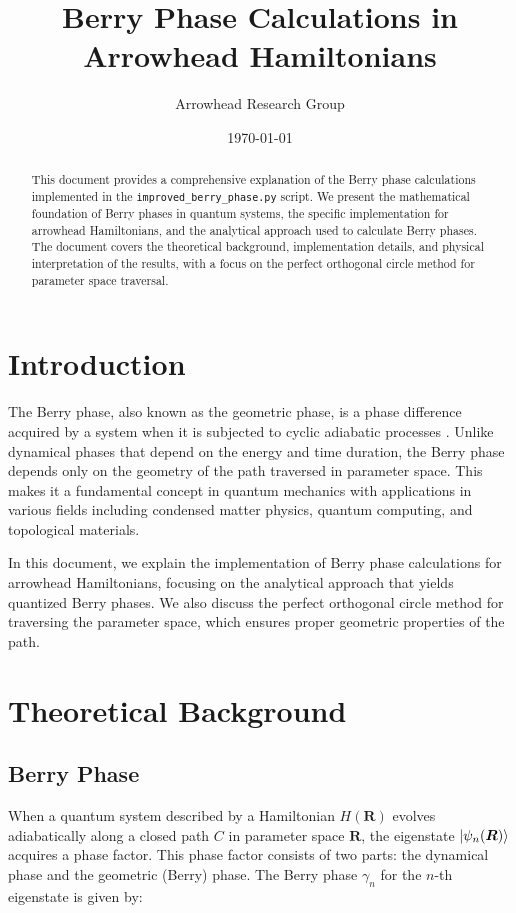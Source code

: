 \documentclass[12pt,a4paper]{article}
\title{Berry Phase Calculations in Arrowhead Hamiltonians}
\author{Arrowhead Research Group}
\date{\today}
\begin{document}
\maketitle

\begin{abstract}
This document provides a comprehensive explanation of the Berry phase calculations implemented in the \texttt{improved\_berry\_phase.py} script. We present the mathematical foundation of Berry phases in quantum systems, the specific implementation for arrowhead Hamiltonians, and the analytical approach used to calculate Berry phases. The document covers the theoretical background, implementation details, and physical interpretation of the results, with a focus on the perfect orthogonal circle method for parameter space traversal.
\end{abstract}

\tableofcontents

\section{Introduction}

The Berry phase, also known as the geometric phase, is a phase difference acquired by a system when it is subjected to cyclic adiabatic processes \cite{berry1984}. Unlike dynamical phases that depend on the energy and time duration, the Berry phase depends only on the geometry of the path traversed in parameter space. This makes it a fundamental concept in quantum mechanics with applications in various fields including condensed matter physics, quantum computing, and topological materials.

In this document, we explain the implementation of Berry phase calculations for arrowhead Hamiltonians, focusing on the analytical approach that yields quantized Berry phases. We also discuss the perfect orthogonal circle method for traversing the parameter space, which ensures proper geometric properties of the path.

\section{Theoretical Background}

\subsection{Berry Phase}

When a quantum system described by a Hamiltonian $H(\bm{R})$ evolves adiabatically along a closed path $C$ in parameter space $\bm{R}$, the eigenstate $\ket{\psi_n(\bm{R})}$ acquires a phase factor. This phase factor consists of two parts: the dynamical phase and the geometric (Berry) phase. The Berry phase $\gamma_n$ for the $n$-th eigenstate is given by:
\end{document}
